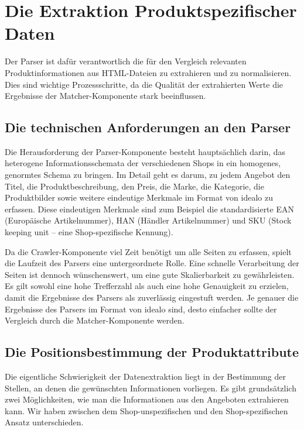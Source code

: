 \section{Die Extraktion Produktspezifischer Daten}
\label{sec:extraktion-produktspezifischer-daten}

Der Parser ist dafür verantwortlich die für den Vergleich relevanten Produktinformationen aus HTML-Dateien zu
extrahieren und zu normalisieren.
Dies sind wichtige Prozessschritte, da die Qualität der extrahierten Werte die Ergebnisse der Matcher-Komponente
stark beeinflussen.

\subsection{Die technischen Anforderungen an den Parser}
\label{subsec:technische-anforderungen-parser}

Die Herausforderung der Parser-Komponente besteht hauptsächlich darin, das heterogene Informationsschemata der
verschiedenen Shops in ein homogenes, genormtes Schema zu bringen.
Im Detail geht es darum, zu jedem Angebot den Titel, die Produktbeschreibung, den Preis, die Marke, die Kategorie,
die Produktbilder sowie weitere eindeutige Merkmale im Format von idealo zu erfassen.
Diese eindeutigen Merkmale sind zum Beispiel die standardisierte EAN (Europäische Artikelnummer), HAN (Händler
Artikelnummer) und SKU (Stock keeping unit -- eine Shop-spezifische Kennung).

Da die Crawler-Komponente viel Zeit benötigt um alle Seiten zu erfassen, spielt die Laufzeit des Parsers eine
untergeordnete Rolle.
Eine schnelle Verarbeitung der Seiten ist dennoch wünschenswert, um eine gute Skalierbarkeit zu gewährleisten.
Es gilt sowohl eine hohe Trefferzahl als auch eine hohe Genauigkeit zu erzielen, damit die  Ergebnisse des Parsers
als zuverlässig eingestuft werden.
Je genauer die Ergebnisse des Parsers im Format von idealo sind, desto einfacher sollte der Vergleich durch die
Matcher-Komponente werden.

\subsection{Die Positionsbestimmung der Produktattribute}
\label{subsec:herangehensweisen}

Die eigentliche Schwierigkeit der Datenextraktion liegt in der Bestimmung der Stellen, an denen die gewünschten
Informationen vorliegen.
Es gibt grundsätzlich zwei Möglichkeiten, wie man die Informationen aus den Angeboten extrahieren kann.
Wir haben zwischen dem Shop-unspezifischen und den Shop-spezifischen Ansatz unterschieden.


